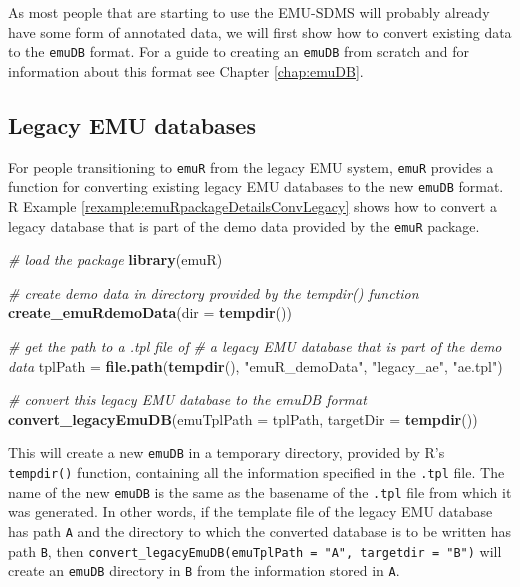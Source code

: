\documentclass[]{book}
\newenvironment{Shaded}{\begin{snugshade}}{\end{snugshade}}
\newcommand{\CommentTok}[1]{\textcolor[rgb]{0.56,0.35,0.01}{\textit{#1}}}
\newcommand{\DataTypeTok}[1]{\textcolor[rgb]{0.13,0.29,0.53}{#1}}
\newcommand{\KeywordTok}[1]{\textcolor[rgb]{0.13,0.29,0.53}{\textbf{#1}}}
\newcommand{\NormalTok}[1]{#1}
\newcommand{\StringTok}[1]{\textcolor[rgb]{0.31,0.60,0.02}{#1}}
\theoremstyle{definition}
\theoremstyle{definition}
\theoremstyle{definition}
\theoremstyle{remark}
\begin{document}
As most people that are starting to use the EMU-SDMS will probably
already have some form of annotated data, we will first show how to
convert existing data to the \texttt{emuDB} format. For a guide to
creating an \texttt{emuDB} from scratch and for information about this
format see Chapter \ref{chap:emuDB}.

\hypertarget{legacy-emu-databases}{%
\subsection{Legacy EMU databases}\label{legacy-emu-databases}}

For people transitioning to \texttt{emuR} from the legacy EMU system,
\texttt{emuR} provides a function for converting existing legacy EMU
databases to the new \texttt{emuDB} format. R Example
\ref{rexample:emuRpackageDetailsConvLegacy} shows how to convert a
legacy database that is part of the demo data provided by the
\texttt{emuR} package.

\begin{Shaded}
\begin{Highlighting}[]
\CommentTok{# load the package}
\KeywordTok{library}\NormalTok{(emuR)}

\CommentTok{# create demo data in directory provided by the tempdir() function}
\KeywordTok{create_emuRdemoData}\NormalTok{(}\DataTypeTok{dir =} \KeywordTok{tempdir}\NormalTok{())}

\CommentTok{# get the path to a .tpl file of}
\CommentTok{# a legacy EMU database that is part of the demo data}
\NormalTok{tplPath =}\StringTok{ }\KeywordTok{file.path}\NormalTok{(}\KeywordTok{tempdir}\NormalTok{(),}
                    \StringTok{"emuR_demoData"}\NormalTok{,}
                    \StringTok{"legacy_ae"}\NormalTok{,}
                    \StringTok{"ae.tpl"}\NormalTok{)}

\CommentTok{# convert this legacy EMU database to the emuDB format}
\KeywordTok{convert_legacyEmuDB}\NormalTok{(}\DataTypeTok{emuTplPath =}\NormalTok{ tplPath, }\DataTypeTok{targetDir =} \KeywordTok{tempdir}\NormalTok{())}
\end{Highlighting}
\end{Shaded}

This will create a new \texttt{emuDB} in a temporary directory, provided
by R's \texttt{tempdir()} function, containing all the information
specified in the \texttt{.tpl} file. The name of the new \texttt{emuDB}
is the same as the basename of the \texttt{.tpl} file from which it was
generated. In other words, if the template file of the legacy EMU
database has path \texttt{A} and the directory to which the converted
database is to be written has path \texttt{B}, then
\texttt{convert\_legacyEmuDB(emuTplPath\ =\ "A",\ targetdir\ =\ "B")}
will create an \texttt{emuDB} directory in \texttt{B} from the
information stored in \texttt{A}.
\end{document}
